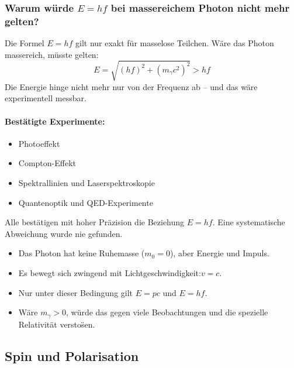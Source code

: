 \subsubsection{Warum w\"urde \( E = h f \) bei massereichem Photon nicht mehr gelten?}

Die Formel $E = hf$ gilt nur exakt f\"ur masselose Teilchen. W\"are das Photon massereich, m\"usste gelten:
\begin{equation}
	E = \sqrt{(hf)^2 + (m_\gamma c^2)^2} > hf
\end{equation}
Die Energie hinge nicht mehr nur von der Frequenz ab -- und das w\"are experimentell messbar.

\paragraph{Best\"atigte Experimente:}
\begin{itemize}
	\item Photoeffekt
	\item Compton-Effekt
	\item Spektrallinien und Laserspektroskopie
	\item Quantenoptik und QED-Experimente
\end{itemize}
Alle best\"atigen mit hoher Pr\"azision die Beziehung $E = hf$. Eine systematische Abweichung wurde nie gefunden.
\vspace{1em}
\begin{tcolorbox}[physikbox, title=Fazit: Warum das Photon masselos ist]
	\begin{itemize}
		\label{box:Warum das Photon}
		\item Das Photon hat keine Ruhemasse ($m_0 = 0$), aber Energie und Impuls.
		\item Es bewegt sich zwingend mit Lichtgeschwindigkeit:\newline $v = c$.
		\item Nur unter dieser Bedingung gilt $E = pc$ und $E = hf$.
		\item W\"are $m_\gamma > 0$, w\"urde das gegen viele Beobachtungen und die spezielle Relativit\"at versto\"sen.
	\end{itemize}
\end{tcolorbox}
\vspace{1em}
\newpage
\noindent
\subsection{Spin und Polarisation}

